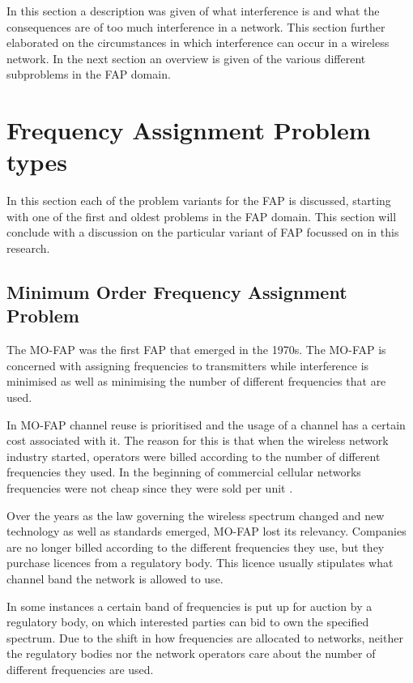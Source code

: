 In this section a description was given of what interference is and what the consequences are of too much interference in a network. This section further elaborated on the circumstances in which interference can occur in a wireless network. In the next section an overview is given of the various different subproblems in the \gls{FAP} domain.


\section{Frequency Assignment Problem types}
\label{sec:FAPVariants}
In this section each of the problem variants for the \gls{FAP} is discussed, starting with one of the first and oldest problems in the \gls{FAP} domain. This section will conclude with a discussion on the particular variant of \gls{FAP} focussed on in this research.
\subsection{Minimum Order Frequency Assignment Problem}
The \gls{MO-FAP} was the first \gls{FAP} that emerged in the 1970s. The \gls{MO-FAP} is concerned with assigning frequencies to transmitters while interference is minimised as well as minimising the number of different frequencies that are used\cite{Karen2004}. 

In \gls{MO-FAP} channel reuse is prioritised and the usage of a channel has a certain cost associated with it. The reason for this is that when the wireless network industry started, operators were billed according to the number of different frequencies they used. In the beginning of commercial cellular networks frequencies were not cheap since they were sold per unit \cite{MontemanniThesis}. 

Over the years as the law governing the wireless spectrum changed and new technology as well as standards emerged, \gls{MO-FAP} lost its relevancy\cite{Karen2004,MontemanniThesis}. Companies are no longer billed according to the different frequencies they use, but they purchase licences from a regulatory body\cite{Karen2004,MontemanniThesis}. This licence usually stipulates what channel band the network is allowed to use.

In some instances a certain band of frequencies is put up for auction by a regulatory body, on which interested parties can bid to own the specified spectrum\cite{Karen2004,MontemanniThesis}. Due to the shift in how frequencies are allocated to networks, neither the regulatory bodies nor the network operators care about the number of different frequencies are used\cite{Karen2004,MontemanniThesis}.
